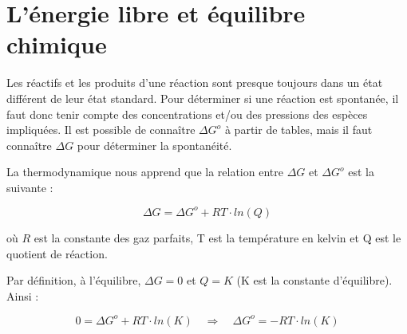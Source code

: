 \documentclass[
  11pt,
  a4paper,
  openany]{book}
\begin{document}
\clearpage

\section{L'énergie libre et équilibre chimique}\label{luxe9nergie-libre-et-uxe9quilibre-chimique}

Les réactifs et les produits d'une réaction sont presque toujours dans un état différent de leur état standard. Pour déterminer si une réaction est spontanée, il faut donc tenir compte des concentrations et/ou des pressions des espèces impliquées. Il est possible de connaître \(\Delta G^o\) à partir de tables, mais il faut connaître \(\Delta G\) pour déterminer la spontanéité.

La thermodynamique nous apprend que la relation entre \(\Delta G\) et \(\Delta G^o\) est la suivante :

\[
\Delta G = \Delta G^o + RT \cdot ln(Q)
\]

où \(R\) est la constante des gaz parfaits, T est la température en kelvin et Q est le quotient de réaction.

Par définition, à l'équilibre, \(\Delta G = 0\) et \(Q = K\) (K est la constante d'équilibre). Ainsi :

\[
0 = \Delta G^o + RT \cdot ln(K) \quad \Rightarrow \quad \Delta G^o = - RT \cdot ln(K)
\]
\end{document}
